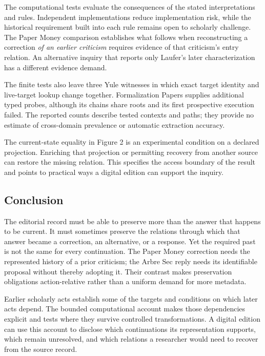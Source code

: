 \documentclass[11pt,a4paper]{article}
\begin{document}
The computational tests evaluate the consequences of the stated interpretations and rules. Independent implementations reduce implementation risk, while the historical requirement built into each rule remains open to scholarly challenge. The Paper Money comparison establishes what follows when reconstructing a correction \emph{of an earlier criticism} requires evidence of that criticism's entry relation. An alternative inquiry that reports only Laufer's later characterization has a different evidence demand.


The finite tests also leave three Yule witnesses in which exact target identity and live-target lookup change together. Formalization Papers supplies additional typed probes, although its chains share roots and its first prospective execution failed. The reported counts describe tested contexts and paths; they provide no estimate of cross-domain prevalence or automatic extraction accuracy.


The current-state equality in Figure 2 is an experimental condition on a declared projection. Enriching that projection or permitting recovery from another source can restore the missing relation. This specifies the access boundary of the result and points to practical ways a digital edition can support the inquiry.


\subsection{Conclusion}

The editorial record must be able to preserve more than the answer that happens to be current. It must sometimes preserve the relations through which that answer became a correction, an alternative, or a response. Yet the required past is not the same for every continuation. The Paper Money correction needs the represented history of a prior criticism; the Arbre Sec reply needs its identifiable proposal without thereby adopting it. Their contrast makes preservation obligations action-relative rather than a uniform demand for more metadata.


Earlier scholarly acts establish some of the targets and conditions on which later acts depend. The bounded computational account makes those dependencies explicit and tests where they survive controlled transformations. A digital edition can use this account to disclose which continuations its representation supports, which remain unresolved, and which relations a researcher would need to recover from the source record.
\end{document}
